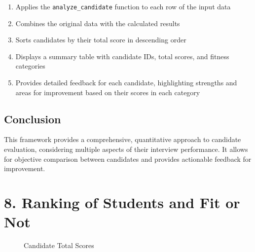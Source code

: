 \documentclass{article}
\begin{document}
\begin{enumerate}
    \item Applies the \texttt{analyze\_candidate} function to each row of the input data
    \item Combines the original data with the calculated results
    \item Sorts candidates by their total score in descending order
    \item Displays a summary table with candidate IDs, total scores, and fitness categories
    \item Provides detailed feedback for each candidate, highlighting strengths and areas for improvement based on their scores in each category
\end{enumerate}

\subsection{Conclusion}

This framework provides a comprehensive, quantitative approach to candidate evaluation, considering multiple aspects of their interview performance. It allows for objective comparison between candidates and provides actionable feedback for improvement.



\section{8. Ranking of Students and Fit or Not}
\begin{figure}[htbp]
    \centering
    \caption{Candidate Total Scores}
    \label{fig:candidate-scores}
    \end{figure}
    
\end{document}
